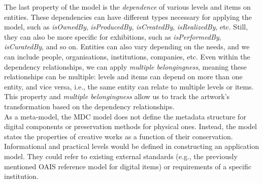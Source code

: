 The last property of the model is the \textit{dependence} of various levels and items on entities. These dependencies can have different types necessary for applying the model, such as \textit{isOwnedBy}, \textit{isProducedBy}, \textit{isCreatedBy}, \textit{isRealizedBy}, etc. Still, they can also be more specific for exhibitions, such as \textit{isPerformedBy}, \textit{isCuratedBy}, and so on. Entities can also vary depending on the needs, and we can include people, organisations, institutions, companies, etc. Even within the dependency relationships, we can apply \textit{multiple belongingness}, meaning these relationships can be multiple: levels and items can depend on more than one entity, and vice versa, i.e., the same entity can relate to multiple levels or items. This property and \textit{multiple belongingness} allow us to track the artwork's transformation based on the dependency relationships.\\
As a meta-model, the MDC model does not define the metadata structure for digital components or preservation methods for physical ones. Instead, the model states the properties of creative works as a function of their conservation. Informational and practical levels would be defined in constructing an application model. They could refer to existing external standards (e.g., the previously mentioned OAIS reference model for digital items) or requirements of a specific institution.

